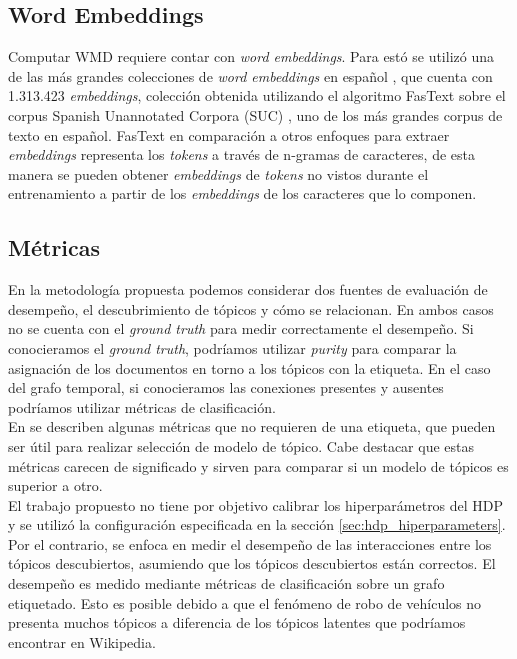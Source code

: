 \documentclass[letterpaper,12pt,oneside]{book} %
\begin{document}
\subsection{Word Embeddings}

Computar WMD requiere contar con \textit{word embeddings}. Para estó se utilizó una de las más grandes colecciones de \textit{word embeddings} en español \citep{fastextSUC}, que cuenta con 1.313.423 \textit{embeddings}, colección obtenida utilizando el algoritmo FasText \citep{bojanowski2017enriching} sobre el corpus Spanish Unannotated Corpora (SUC) \citep{josecanneteSUC}, uno de los más grandes corpus de texto en español. FasText en comparación a otros enfoques para extraer \textit{embeddings} representa los \textit{tokens} a través de n-gramas de caracteres, de esta manera se pueden obtener \textit{embeddings} de \textit{tokens} no vistos durante el entrenamiento a partir de los \textit{embeddings} de los caracteres que lo componen.

\subsection{Métricas}

En la metodología propuesta podemos considerar dos fuentes de evaluación de desempeño, el descubrimiento de tópicos y cómo se relacionan. En ambos casos no se cuenta con el \textit{ground truth} para medir correctamente el desempeño. Si conocieramos el \textit{ground truth}, podríamos utilizar \textit{purity} \citep{manning2008introduction} para comparar la asignación de los documentos en torno a los tópicos con la etiqueta. En el caso del grafo temporal, si conocieramos las conexiones presentes y ausentes podríamos utilizar métricas de clasificación.\\

En \citep{blei2003latent,griffiths2004finding,cao2009density,arun2010finding,deveaud2014accurate,zhang2017lda} se describen algunas métricas que no requieren de una etiqueta, que pueden ser útil para realizar selección de modelo de tópico. Cabe destacar que estas métricas carecen de significado y sirven para comparar si un modelo de tópicos es superior a otro.\\

El trabajo propuesto no tiene por objetivo calibrar los hiperparámetros del HDP y se utilizó la configuración especificada en la sección \ref{sec:hdp_hiperparameters}. Por el contrario, se enfoca en medir el desempeño de las interacciones entre los tópicos descubiertos, asumiendo que los tópicos descubiertos están correctos. El desempeño es medido mediante métricas de clasificación sobre un grafo etiquetado. Esto es posible  debido a que el fenómeno de robo de vehículos no presenta muchos tópicos a diferencia de los tópicos latentes que podríamos encontrar en Wikipedia.\\
\end{document}
